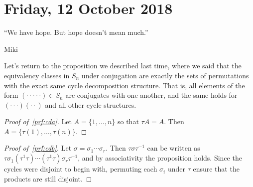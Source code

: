 \section{Friday, 12 October 2018}

\epigraph{``We have hope. But hope doesn't mean much.''}{Miki}

Let's return to the proposition we described last time, where we said that the equivalency classes in $S_n$ under conjugation are exactly the sets of permutations with the exact same cycle decomposition structure. That is, all elements of the form $(\cdot \cdot \cdot \cdot \cdot) \in S_n$ are conjugates with one another, and the same holds for $(\cdot \cdot \cdot)(\cdot \cdot)$ and all other cycle structures.

\begin{proposition} \hfill
{}
\end{proposition}

\begin{proof}[Proof of\/~\ref{prf:cda}]
Let $A = \{1, \dotsc, n\}$ so that $\tau A = A$. Then $A = \{\tau(1), \dotsc, \tau(n)\}$. 
\end{proof}

\begin{proof}[Proof of\/~\ref{prf:cdb}]
Let $\sigma = \sigma_1 \cdots \sigma_r$. Then $\tau\sigma\tau^{-1}$ can be written as $\tau\sigma_1(\tau^{1}\tau) \cdots (\tau^{1}\tau) \sigma_r \tau^{-1}$, and by associativity the proposition holds. Since the cycles were disjoint to begin with, permuting each $\sigma_i$ under $\tau$ ensure that the products are still disjoint.
\end{proof}

